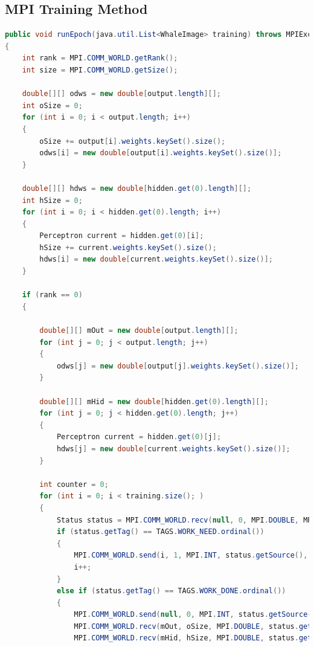 \documentclass[10pt]{IEEEtran}
\newcommand{\?}{\stackrel{?}{=}}
\begin{document}
\newpage

\nocite{*}
\newpage
\begin{appendices}
\onecolumn
\footnotesize
{}
\section{MPI Training Method}\label{App:AppendixA}
\label{appendix:mpi}
\begin{lstlisting}[language=Java]
public void runEpoch(java.util.List<WhaleImage> training) throws MPIException
{
    int rank = MPI.COMM_WORLD.getRank();
    int size = MPI.COMM_WORLD.getSize();

    double[][] odws = new double[output.length][];
    int oSize = 0;
    for (int i = 0; i < output.length; i++)
    {
        oSize += output[i].weights.keySet().size();
        odws[i] = new double[output[i].weights.keySet().size()];
    }

    double[][] hdws = new double[hidden.get(0).length][];
    int hSize = 0;
    for (int i = 0; i < hidden.get(0).length; i++)
    {
        Perceptron current = hidden.get(0)[i];
        hSize += current.weights.keySet().size();
        hdws[i] = new double[current.weights.keySet().size()];
    }

    if (rank == 0)
    {

        double[][] mOut = new double[output.length][];
        for (int j = 0; j < output.length; j++)
        {
            odws[j] = new double[output[j].weights.keySet().size()];
        }

        double[][] mHid = new double[hidden.get(0).length][];
        for (int j = 0; j < hidden.get(0).length; j++)
        {
            Perceptron current = hidden.get(0)[j];
            hdws[j] = new double[current.weights.keySet().size()];
        }

        int counter = 0;
        for (int i = 0; i < training.size(); )
        {
            Status status = MPI.COMM_WORLD.recv(null, 0, MPI.DOUBLE, MPI.ANY_SOURCE, MPI.ANY_TAG);
            if (status.getTag() == TAGS.WORK_NEED.ordinal())
            {
                MPI.COMM_WORLD.send(i, 1, MPI.INT, status.getSource(), TAGS.WORK_TODO.ordinal());
                i++;
            }
            else if (status.getTag() == TAGS.WORK_DONE.ordinal())
            {
                MPI.COMM_WORLD.send(null, 0, MPI.INT, status.getSource(), TAGS.WORK_TODO.ordinal());
                MPI.COMM_WORLD.recv(mOut, oSize, MPI.DOUBLE, status.getSource(), TAGS.WORK_DONE.ordinal());
                MPI.COMM_WORLD.recv(mHid, hSize, MPI.DOUBLE, status.getSource(), TAGS.WORK_DONE.ordinal());


\end{lstlisting}
\end{appendices}
\end{document}
